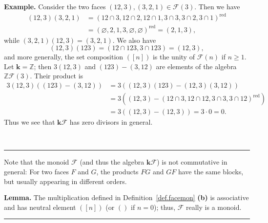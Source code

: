 \documentclass[12pt]{article}
\theoremstyle{definition}%
\newtheorem{lem}[thm]{Lemma}
\theoremstyle{definition}%
\newtheorem{exmp}[thm]{Example}
\theoremstyle{remark}%
\newcommand{\tup}[1]{\left( #1 \right)}
\newcommand{\interval}[1]{\left[ #1 \right]} %
\newcommand{\ZZ}{\mathbb{Z}}
\newcommand{\kk}{\mathbf{k}}
\newcommand{\kf}{\kk\mathcal{F}}
\newcommand{\CF}{\mathcal{F}}
\newcommand{\red}{\operatorname{red}}
\newenvironment{lem}[1][Lemma]{\noindent\textbf{#1.} }{\ \rule{0.5em}{0.5em}}
\newenvironment{exmp}[1][Example]{\noindent\textbf{#1.} }{\ \rule{0.5em}{0.5em}}
\begin{document}
\begin{exmp}
    Consider the two faces $ \tup{ 12,3 },\tup{ 3,2,1 } \in \CF\tup{ 3 } $. Then we have
    \begin{align*}
        \tup{ 12,3 }\tup{ 3,2,1 } &= \tup{ 12 \cap 3, 12 \cap 2, 12 \cap 1, 3 \cap 3, 3 \cap 2, 3 \cap 1 }^{ \red}\\ 
                                  &= \tup{ \varnothing, 2,1,3,\varnothing,\varnothing}^{ \red}=\tup{ 2,1,3 },
    \end{align*}
    while $ \tup{ 3,2,1 }\tup{ 12,3 }=\tup{ 3,2,1 } $. We also have
    \[
    \tup{ 12,3 }\tup{ 123 }=\tup{ 12 \cap 123, 3 \cap 123 }=\tup{ 12,3 },
    \]
    and more generally, the set composition $ \tup{ \interval{n} } $ is the unity of $ \CF\tup{ n } $ if $n\geq 1$. Let $ \kk = \ZZ $; then $ 3\tup{ 12,3 } $ and $ \tup{ 123 }-\tup{ 3,12 } $ are elements of the algebra $ \ZZ\CF\tup{ 3 } $. Their product is
    \begin{align*}
        3\tup{ 12,3 }\tup{ \tup{ 123 }-\tup{ 3,12 } } &= 3\tup{ \tup{ 12,3 }\tup{ 123 }-\tup{ 12,3 }\tup{ 3,12 } }\\
                                                      &= 3\tup{ \tup{ 12,3 }-\tup{ 12 \cap 3, 12 \cap 12, 3 \cap 3, 3 \cap 12 }^{ \red} }\\
                                                      &= 3\tup{ \tup{ 12,3 }-\tup{ 12,3 } }= 3 \cdot 0 = 0.
    \end{align*}
    Thus we see that $\kf$ has zero divisors in general. 
    
\end{exmp}

Note that the monoid $\CF$ (and thus the algebra $\kf$) is not commutative in general: For two faces $F$ and $G$, the products $FG$ and $GF$ have the same blocks, but usually appearing in different orders.

\begin{lem}
\label{lem.monoid}
The multiplication defined in Definition~\ref{def.facemon} \textbf{(b)} is associative and has neutral element $\tup{\interval{n}}$ (or $\tup{}$ if $n=0$); thus, $\CF$ really is a monoid.
\end{lem}
\end{document}
